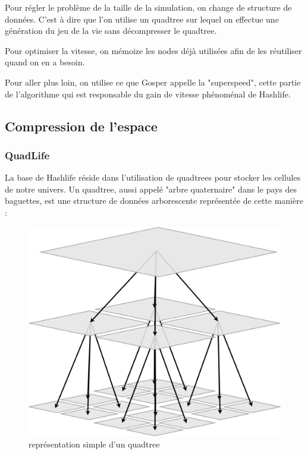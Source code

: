 Pour régler le problème de la taille de la simulation, on change de structure de données. C'est à dire que l'on utilise un quadtree sur lequel on effectue une génération du jeu de la vie sans décompresser le quadtree.

Pour optimiser la vitesse, on mémoize les nodes déjà utilisées afin de les réutiliser quand on en a besoin.

Pour aller plus loin, on utilise ce que Gosper appelle la "superspeed", cette partie de l'algorithme qui est responsable du gain de vitesse phénoménal de Hashlife.

\subsection{Compression de l'espace}
\subsubsection{QuadLife}

La base de Hashlife réside dans l'utilisation de quadtrees pour stocker les cellules de notre univers. Un quadtree, aussi appelé "arbre quaternaire" dans le pays des baguettes, est une structure de données arborescente représentée de cette manière : 

\begin{figure}[htp]
        \center
        \includegraphics[scale=0.1]{images/imgHashlife/representationquadtree.png}
        \caption{représentation simple d'un quadtree}
\end{figure}

